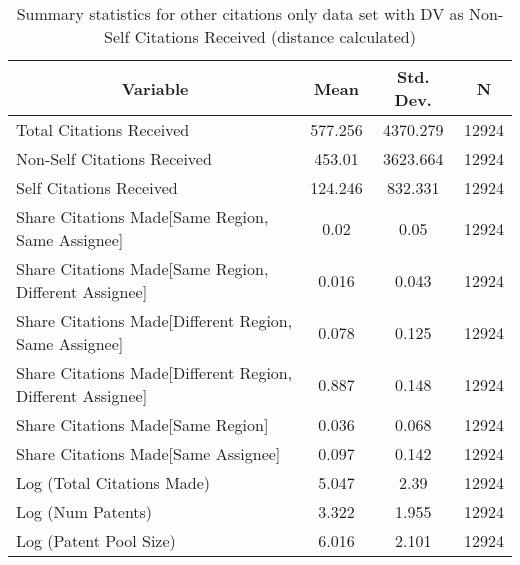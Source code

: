 
\begin{table}[htbp]\centering \caption{Summary statistics for other citations only data set with DV as Non-Self Citations Received (distance calculated) \label{o.nsummary}}
\scriptsize
\singlespacing
\begin{tabular}{l c c  c}\hline\hline
\multicolumn{1}{c}{\textbf{Variable}} & \textbf{Mean}
 & \textbf{Std. Dev.} & \textbf{N}\\ \hline
Total Citations Received & 577.256 & 4370.279  & 12924\\
Non-Self Citations Received & 453.01 & 3623.664  & 12924\\
Self Citations Received & 124.246 & 832.331  & 12924\\
Share Citations Made[Same Region, Same Assignee] & 0.02 & 0.05  & 12924\\
Share Citations Made[Same Region, Different Assignee] & 0.016 & 0.043  & 12924\\
Share Citations Made[Different Region, Same Assignee] & 0.078 & 0.125  & 12924\\
Share Citations Made[Different Region, Different Assignee] & 0.887 & 0.148  & 12924\\
Share Citations Made[Same Region] & 0.036 & 0.068  & 12924\\
Share Citations Made[Same Assignee] & 0.097 & 0.142  & 12924\\
Log (Total Citations Made) & 5.047 & 2.39  & 12924\\
Log (Num Patents) & 3.322 & 1.955  & 12924\\
Log (Patent Pool Size) & 6.016 & 2.101  & 12924\\
\hline\end{tabular}
\end{table}
